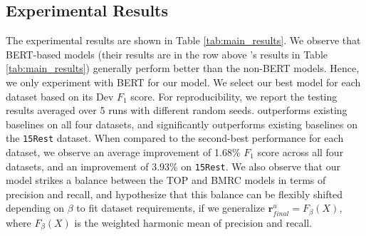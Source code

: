 \documentclass[sigconf]{acmart}
\begin{document}
\begin{table}[ht!]
\caption{$F_1$ Scores for Multiple and Overlapping Triplets}
\small
\label{tab:multiple_triplets}
\centering
{}
\vspace{-2.4em}
\end{table}
\subsection{Experimental Results}

The experimental results are shown in Table \ref{tab:main_results}. We observe that BERT-based models (their results are in the row above \mymodel{}'s results in Table \ref{tab:main_results}) generally perform better than the non-BERT models. Hence, we only experiment with BERT for our \mymodel{} model. We select our best model for each dataset based on its Dev $F_1$ score. For reproducibility, we report the testing results averaged over 5 runs with different random seeds. \mymodel{} outperforms existing baselines on all four datasets, and significantly outperforms existing baselines on the \texttt{15Rest} dataset. When compared to the second-best performance for each dataset, we observe an average improvement of 1.68\% $F_1$ score across all four datasets, and an improvement of 3.93\% on \texttt{15Rest}. We also observe that our model strikes a balance between the TOP and BMRC models in terms of precision and recall, and hypothesize that this balance can be flexibly shifted depending on $\beta$ to fit dataset requirements, if we generalize $\mathrm{\textbf{r}}^u_{final} = F_{\beta}(X)$, where $F_{\beta}(X)$ is the weighted harmonic mean of precision and recall.
\end{document}
